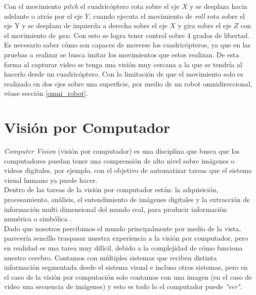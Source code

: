 \documentclass{iccmemoria}
\begin{document}
Con el movimiento \emph{pitch} el cuadricóptero rota sobre el eje $X$ y se desplaza hacia adelante o atrás por el eje $Y$, cuando ejecuta el movimiento de \emph{roll} rota sobre el eje Y y se desplaza de izquierda a derecha sobre el eje $X$ y gira sobre el eje $Z$ con el movimiento de \emph{yaw}. Con esto se logra tener control sobre 4 grados de libertad.\\

Es necesario saber cómo son capaces de moverse los cuadricópteros, ya que en las pruebas a realizar se busca imitar los movimientos que estos realizan. De esta forma al capturar video se tenga una visión muy cercana a la que se tendría al hacerlo desde un cuadricóptero. Con la limitación de que el movimiento solo es realizado en dos ejes sobre una superficie, por medio de un robot omnidireccional, véase sección \ref{omni_robot}.\\

\section{Visión por Computador}

\emph{Computer Vision} (visión por computador) es una disciplina que busca que los computadores puedan tener una comprensión de alto nivel sobre imágenes o videos digitales, por ejemplo, con el objetivo de automatizar tareas que el sistema visual humano ya puede hacer\cite{ballard1982computer, vandoni1996proceedings, sonka2008image}.\\

Dentro de las tareas de la visión por computador están: la adquisición, procesamiento, análisis, el entendimiento de imágenes digitales y la extracción de información multi dimensional del mundo real, para producir información numérica o simbólica \cite{klette2014concise, shapiro2001computer, morris2004computer, forsyth2003computer}.\\

Dado que nosotros percibimos el mundo principalmente por medio de la vista, parecería sencillo traspasar nuestra experiencia a la visión por computador, pero en realidad es una tarea muy difícil, debido a la complejidad de cómo funciona nuestro cerebro. Contamos con múltiples sistemas que reciben distinta información segmentada desde el sistema visual e incluso otros sistemas, pero en el caso de la visión por computación solo contamos con una imagen (en el caso de video una secuencia de imágenes) y esto es todo lo el computador puede \emph{"ver"}.\\
\end{document}
